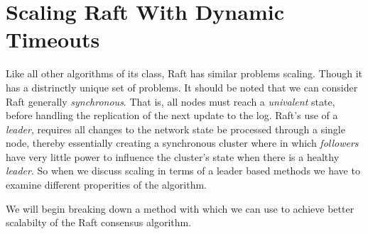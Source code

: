 \section{Scaling Raft With Dynamic Timeouts}

Like all other algorithms of its class, Raft has similar problems scaling. Though it has a distrinctly unique set of problems. It should be noted that we can consider Raft generally \textit{synchronous}. That is, all nodes must reach a \textit{univalent} state, before handling the replication of the next update to the log. Raft's use of a \textit{leader}, requires all changes to the network state be processed through a single node, thereby essentially creating a synchronous cluster where in which \textit{followers} have very little power to influence the cluster's state when there is a healthy \textit{leader}. So when we discuss scaling in terms of a leader based methods we have to examine different properities of the algorithm.

We will begin breaking down a method with which we can use to achieve better scalabilty of the Raft consensus algorithm.